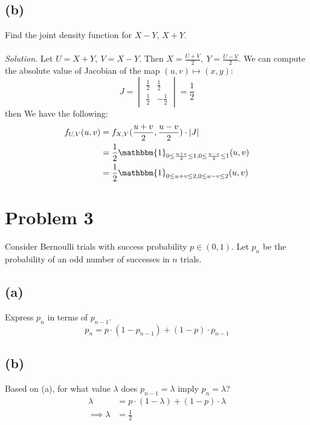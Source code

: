 \documentclass{article}
\begin{document}
\subsection*{(b)}
Find the joint density function for $X-Y$, $X+Y$.\\
\\
\color{blue}
\textit{Solution.} Let $U = X+Y,\ V=X-Y$. Then $ X = \frac{U+V}{2},\ Y = \frac{U-V}{2}$. We can compute the absolute value of Jacobian of the map $(u,v) \mapsto (x,y) $:
\begin{equation*}
    J = 
    \begin{vmatrix}
    \frac{1}{2} & \frac{1}{2}\\
    \frac{1}{2} & -\frac{1}{2}
    \end{vmatrix}
    =\frac{1}{2}
\end{equation*}
then We have the following:
\begin{equation*}
    \begin{split}
        f_{U,V}(u,v) &= f_{X,Y}(\frac{u+v}{2},\frac{u-v}{2})\cdot |J| \\
        &= \frac{1}{2}\mathbbm{1}_{0 \leq \frac{u+v}{2} \leq 1, 0 \leq \frac{u-v}{2}\leq 1}(u,v)\\
        &= \frac{1}{2}\mathbbm{1}_{0 \leq u+v \leq 2, 0 \leq u-v \leq 2}(u,v)
    \end{split}
\end{equation*}
\color{black}
\section*{Problem 3}
Consider Bernoulli trials with success probability $p\in (0,1)$. Let $p_n$ be the probability of an odd number of successes in $n$ trials.
\subsection*{(a)}
Express $p_n$ in terms of $p_{n-1}$.
\color{blue}
\begin{equation*}
    p_n = p\cdot(1-p_{n-1})+(1-p)\cdot p_{n-1}
\end{equation*}
\color{black}
\subsection*{(b)}
Based on (a), for what value $\lambda$ does $p_{n-1}=\lambda$ imply $p_n=\lambda$?
\color{blue}
\begin{equation*}
    \begin{split}
        \lambda &= p \cdot (1-\lambda)+(1-p)\cdot\lambda\\
        \implies \lambda &= \frac{1}{2}
    \end{split}
\end{equation*}
\color{black}
\end{document}
